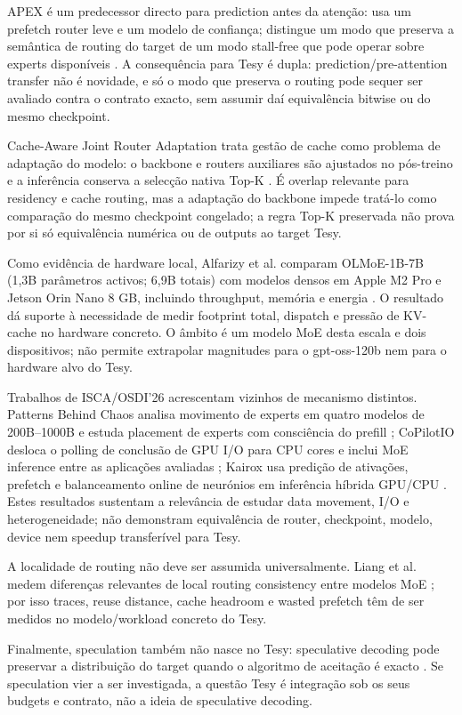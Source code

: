 APEX é um predecessor directo para prediction antes da atenção: usa um prefetch router leve e um modelo de confiança; distingue um modo que preserva a semântica de routing do target de um modo stall-free que pode operar sobre experts disponíveis \cite{kanani2026apex}. A consequência para Tesy é dupla: prediction/pre-attention transfer não é novidade, e só o modo que preserva o routing pode sequer ser avaliado contra o contrato exacto, sem assumir daí equivalência bitwise ou do mesmo checkpoint.

Cache-Aware Joint Router Adaptation trata gestão de cache como problema de adaptação do modelo: o backbone e routers auxiliares são ajustados no pós-treino e a inferência conserva a selecção nativa Top-K \cite{wu2026cacheaware}. É overlap relevante para residency e cache routing, mas a adaptação do backbone impede tratá-lo como comparação do mesmo checkpoint congelado; a regra Top-K preservada não prova por si só equivalência numérica ou de outputs ao target Tesy.

Como evidência de hardware local, Alfarizy et al. comparam OLMoE-1B-7B (1,3B parâmetros activos; 6,9B totais) com modelos densos em Apple M2 Pro e Jetson Orin Nano 8 GB, incluindo throughput, memória e energia \cite{alfarizy2026consumer}. O resultado dá suporte à necessidade de medir footprint total, dispatch e pressão de KV-cache no hardware concreto. O âmbito é um modelo MoE desta escala e dois dispositivos; não permite extrapolar magnitudes para o gpt-oss-120b nem para o hardware alvo do Tesy.

Trabalhos de ISCA/OSDI'26 acrescentam vizinhos de mecanismo distintos. Patterns Behind Chaos analisa movimento de experts em quatro modelos de 200B--1000B e estuda placement de experts com consciência do prefill \cite{yu2026patterns}; CoPilotIO desloca o polling de conclusão de GPU I/O para CPU cores e inclui MoE inference entre as aplicações avaliadas \cite{chen2026copilotio}; Kairox usa predição de ativações, prefetch e balanceamento online de neurónios em inferência híbrida GPU/CPU \cite{jiang2026kairox}. Estes resultados sustentam a relevância de estudar data movement, I/O e heterogeneidade; não demonstram equivalência de router, checkpoint, modelo, device nem speedup transferível para Tesy.

A localidade de routing não deve ser assumida universalmente. Liang et al. medem diferenças relevantes de local routing consistency entre modelos MoE \cite{liang2026routing}; por isso traces, reuse distance, cache headroom e wasted prefetch têm de ser medidos no modelo/workload concreto do Tesy.

Finalmente, speculation também não nasce no Tesy: speculative decoding pode preservar a distribuição do target quando o algoritmo de aceitação é exacto \cite{leviathan2023speculative}. Se speculation vier a ser investigada, a questão Tesy é integração sob os seus budgets e contrato, não a ideia de speculative decoding.
